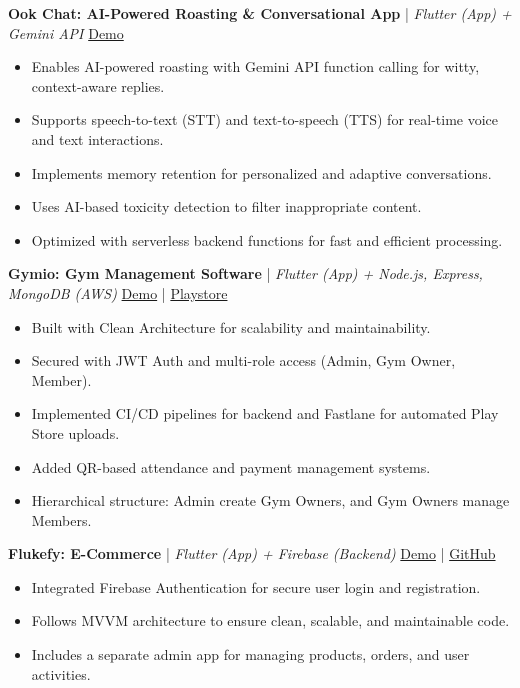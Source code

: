 \documentclass[a4paper,11pt]{article}
\begin{document}
\textbf{Ook Chat: AI-Powered Roasting \& Conversational App} | \textit{Flutter (App) + Gemini API} \hfill \href{}{Demo}
\begin{itemize}[leftmargin=1.5em, itemsep=2pt, topsep=4pt]
    \item Enables AI-powered roasting with Gemini API function calling for witty, context-aware replies.
    \item Supports speech-to-text (STT) and text-to-speech (TTS) for real-time voice and text interactions.
    \item Implements memory retention for personalized and adaptive conversations.
    \item Uses AI-based toxicity detection to filter inappropriate content.
    \item Optimized with serverless backend functions for fast and efficient processing.
\end{itemize}

\textbf{Gymio: Gym Management Software} | \textit{Flutter (App) + Node.js, Express, MongoDB (AWS)} \hfill \href{}{Demo} | \href{}{Playstore}
\begin{itemize}[leftmargin=1.5em, itemsep=2pt, topsep=4pt]
    \item Built with Clean Architecture for scalability and maintainability.
    \item Secured with JWT Auth and multi-role access (Admin, Gym Owner, Member).
    \item Implemented CI/CD pipelines for backend and Fastlane for automated Play Store uploads.
    \item Added QR-based attendance and payment management systems.
    \item Hierarchical structure: Admin create Gym Owners, and Gym Owners manage Members.
\end{itemize}

\textbf{Flukefy: E-Commerce} | \textit{Flutter (App) + Firebase (Backend)} \hfill \href{}{Demo} | \href{}{GitHub}
\begin{itemize}[leftmargin=1.5em, itemsep=2pt, topsep=4pt]
    \item Integrated Firebase Authentication for secure user login and registration.
    \item Follows MVVM architecture to ensure clean, scalable, and maintainable code.
    \item Includes a separate admin app for managing products, orders, and user activities.
\end{itemize}
\end{document}
